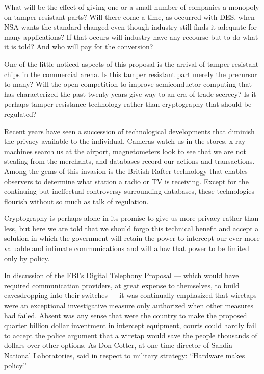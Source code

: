 \para What will be the effect of giving one or a small number of
companies a monopoly on tamper resistant parts?  Will there come a
time, as occurred with DES, when NSA wants the standard changed even
though industry still finds it adequate for many applications?  If
that occurs will industry have any recourse but to do what it is told?
And who will pay for the conversion? \endpara

\para One of the little noticed aspects of this proposal is the
arrival of tamper resistant chips in the commercial arena.  Is this
tamper resistant part merely the precursor to many?  Will the open
competition to improve semiconductor computing that has characterized
the past twenty-years give way to an era of trade secrecy?  Is it
perhaps tamper resistance technology rather than cryptography that
should be regulated? \endpara

\bigskip

\para Recent years have seen a succession of technological
developments that diminish the privacy available to the individual.
Cameras watch us in the stores, x-ray machines search us at the
airport, magnetometers look to see that we are not stealing from the
merchants, and databases record our actions and transactions.  Among
the gems of this invasion is the British Rafter technology that
enables observers to determine what station a radio or TV is
receiving.  Except for the continuing but ineffectual controversy
surrounding databases, these technologies flourish without so much as
talk of regulation. \endpara

\para Cryptography is perhaps alone in its promise to give us more
privacy rather than less, but here we are told that we should forgo
this technical benefit and accept a solution in which the government
will retain the power to intercept our ever more valuable and intimate
communications and will allow that power to be limited only by policy.
\endpara

\para In discussion of the FBI's Digital Telephony Proposal --- which
would have required communication providers, at great expense to
themselves, to build eavesdropping into their switches --- it was
continually emphasized that wiretaps were an exceptional investigative
measure only authorized when other measures had failed.  Absent was
any sense that were the country to make the proposed quarter billion
dollar inventment in intercept equipment, courts could hardly fail to
accept the police argument that a wiretap would save the people
thousands of dollars over other options.  As Don Cotter, at one time
director of Sandia National Laboratories, said in respect to military
strategy: ``Hardware makes policy.'' \endpara

